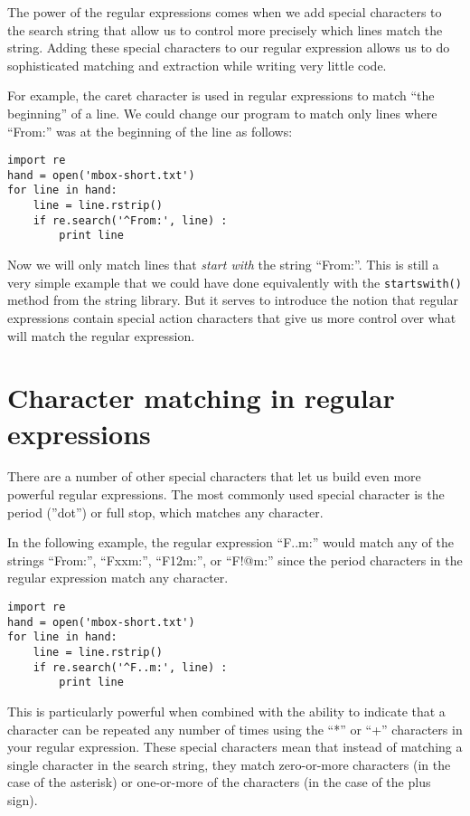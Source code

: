 The power of the regular expressions comes when we add special characters to the search string
that allow us to control more precisely which lines match the string.  Adding these special
characters to our regular expression allows us to do sophisticated matching and extraction while
writing very little code.

For example, the caret character is used in regular
expressions to match ``the beginning'' of a line.
We could change our program to match only
lines where ``From:'' was at the beginning of the line as follows:

\beforeverb
\begin{verbatim}
import re
hand = open('mbox-short.txt')
for line in hand:
    line = line.rstrip()
    if re.search('^From:', line) :
        print line
\end{verbatim}
\afterverb
%
Now we will only match lines that {\em start with} the string ``From:''.  This is still a very
simple example that we could have done equivalently with the {\tt startswith()} method from
the string library.  But it serves to introduce the notion that regular expressions contain
special action characters that give us more control over what will match the regular expression.

\section{Character matching in regular expressions}

There are a number of other special characters that let us build even more powerful regular
expressions.  The most commonly used special character is the period (''dot'') or full stop, which matches
any character.

In the following example, the regular expression ``F..m:'' would match any of the strings
``From:'', ``Fxxm:'', ``F12m:'', or ``F!@m:'' since the period characters in the regular
expression match any character.

\beforeverb
\begin{verbatim}
import re
hand = open('mbox-short.txt')
for line in hand:
    line = line.rstrip()
    if re.search('^F..m:', line) :
        print line
\end{verbatim}
\afterverb
%
This is particularly powerful when combined with the ability to indicate that a character can
be repeated any number of times using the ``*'' or ``+'' characters in your regular expression.
These special characters mean that instead of matching a single character in the search string,
they match zero-or-more characters (in the case of the asterisk) or one-or-more of the characters
(in the case of the plus sign).

